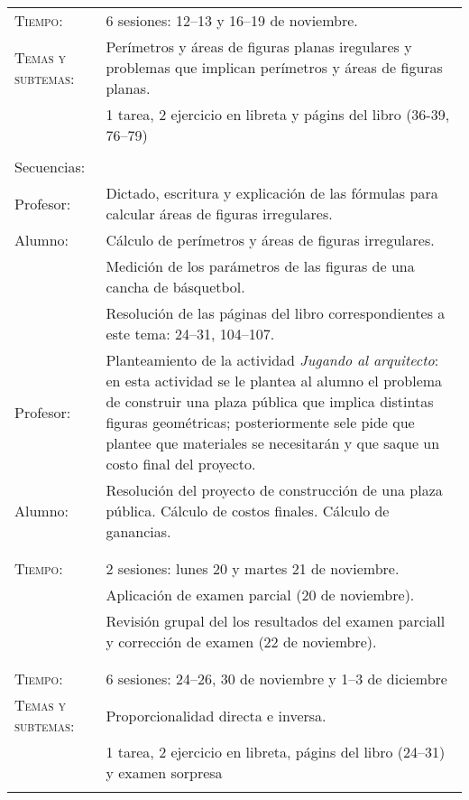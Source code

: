 \documentclass[letterpaper,10pt]{article}
\begin{document}
\begin{tabular}[t]{R{0.25\textwidth}p{0.71\textwidth}}

    \textsc{Tiempo:}                    & 6 sesiones: 12--13 y 16--19  de noviembre. \\
    \textsc{Temas y subtemas:}          & Per\'imetros y \'areas de figuras planas iregulares y problemas que implican per\'imetros y \'areas de figuras planas.\\
              & 1 tarea, 2 ejercicio en libreta y p\'agins del libro (36-39, 76--79) \\ \\
    \large{\sc Secuencias:} \\
    Profesor:   & Dictado, escritura y explicaci\'on de las f\'ormulas para calcular \'areas de figuras irregulares. \\
    Alumno:     & C\'alculo de per\'imetros y \'areas de figuras irregulares. \\
                & Medici\'on de los par\'ametros de las figuras de una cancha de b\'asquetbol.  \\
                & Resoluci\'on de las p\'aginas del libro correspondientes a este tema: 24--31, 104--107. \\
    Profesor:   & Planteamiento de la actividad \textit{Jugando al arquitecto}: en esta actividad se le plantea al alumno el problema de construir una plaza p\'ublica que implica distintas figuras geom\'etricas; posteriormente sele pide que plantee que materiales se necesitar\'an y que saque un costo final del proyecto. \\
    Alumno:     & Resoluci\'on del proyecto de construcci\'on de una plaza p\'ublica. C\'alculo de costos finales. C\'alculo de ganancias.\\
\\ \hline \\
 
    \textsc{Tiempo:}& 2 sesiones: lunes 20 y martes 21  de noviembre. \\
                    & {\Large \sc Aplicaci\'on de examen parcial} (20 de noviembre). \\ 
                    & Revisi\'on grupal del los resultados del examen parciall y correcci\'on de examen (22 de noviembre).\\
\\ \hline \\
    \textsc{Tiempo:}                    & 6 sesiones: 24--26, 30 de noviembre y 1--3 de diciembre \\
    \textsc{Temas y subtemas:}          & Proporcionalidad directa e inversa. \\
              & 1 tarea, 2 ejercicio en libreta, p\'agins del libro (24--31) y examen sorpresa \\ \\


\end{tabular}
\end{document}
